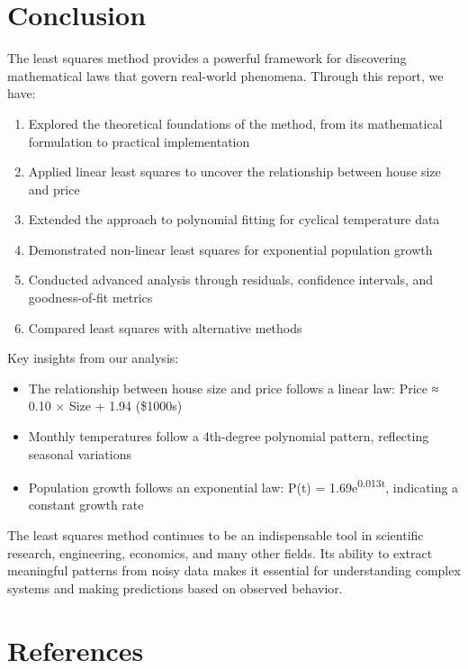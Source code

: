 \documentclass[12pt]{article}
\begin{document}
\section{Conclusion}

The least squares method provides a powerful framework for discovering mathematical laws that govern real-world phenomena. Through this report, we have:

\begin{enumerate}
    \item Explored the theoretical foundations of the method, from its mathematical formulation to practical implementation
    \item Applied linear least squares to uncover the relationship between house size and price
    \item Extended the approach to polynomial fitting for cyclical temperature data
    \item Demonstrated non-linear least squares for exponential population growth
    \item Conducted advanced analysis through residuals, confidence intervals, and goodness-of-fit metrics
    \item Compared least squares with alternative methods
\end{enumerate}

Key insights from our analysis:
\begin{itemize}
    \item The relationship between house size and price follows a linear law: Price ≈ 0.10 × Size + 1.94 (\$1000s)
    \item Monthly temperatures follow a 4th-degree polynomial pattern, reflecting seasonal variations
    \item Population growth follows an exponential law: P(t) = 1.69e\textsuperscript{0.013t}, indicating a constant growth rate
\end{itemize}

The least squares method continues to be an indispensable tool in scientific research, engineering, economics, and many other fields. Its ability to extract meaningful patterns from noisy data makes it essential for understanding complex systems and making predictions based on observed behavior.

\section{References}
\end{document}
